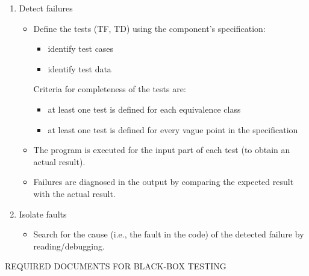 \begin{enumerate}
\item Detect failures

\begin{itemize}

\item Define the tests (TF, TD) using the component's specification:
\begin{itemize}
\item identify test cases 
\item identify test data
\end{itemize}

Criteria for completeness of the tests are:
\begin{itemize}
\item at least one test is defined for each equivalence class
\item at least one test is defined for every vague point in the
specification 

\end{itemize}

\item The program is executed for the input part of each test
(to obtain an actual result).

\item Failures are diagnosed in the output by comparing the expected
result with the actual result.

\end{itemize} 

\item Isolate faults
\begin{itemize}
\item Search for the cause (i.e., the fault in the code) of the
detected failure by reading/debugging.
\end{itemize}

\end{enumerate}


\newpage
\centerline{REQUIRED DOCUMENTS FOR BLACK-BOX TESTING}
\bigskip

